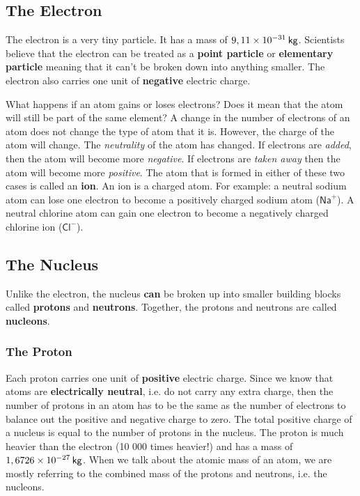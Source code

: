             \subsection*{The Electron}
            \nopagebreak
        \label{m38745*id255241}The electron is a very tiny particle. It has a mass of $9,11\ensuremath{\times}{10}^{-31}\phantom{\rule{2pt}{0ex}}\mathsf{kg}$.
Scientists believe that the electron can be treated as a \textbf{point particle}
or \textbf{elementary particle}
meaning that it can't be broken down into anything smaller. The electron also carries one unit of \textbf{negative} electric charge.\par \label{m38745*eip-222}What happens if an atom gains or loses electrons? Does it mean that the atom will still be part of the same element? A change in the number of electrons of an atom does not change the type of atom that it is. However, the charge of the atom will change. The \textsl{neutrality} of the atom has changed. If electrons are \textsl{added}, then the atom will become more \textsl{negative}. If electrons are \textsl{taken away} then the atom will become more \textsl{positive}. The atom that is formed in either of these two cases is called an \textbf{ion}. An ion is a charged atom. For example: a neutral sodium atom can lose one electron to become a positively charged sodium atom ($\mathsf{Na}^{+}$). A neutral chlorine atom can gain one electron to become a negatively charged chlorine ion ($\mathsf{Cl}^{-}$).\par 
      \label{m38745*uid11}
            \subsection*{The Nucleus}
            \nopagebreak
        \label{m38745*id255305}Unlike the electron, the nucleus \textbf{can} be broken up into smaller building
blocks called \textbf{protons} and \textbf{neutrons}. Together, the protons and
neutrons are called \textbf{nucleons}.\par 
        \label{m38745*uid12}
            \subsubsection*{The Proton}
            \nopagebreak
          \label{m38745*id255338}Each proton carries one unit of \textbf{positive} electric charge.
Since we know that atoms are
\textbf{electrically neutral}, i.e. do not carry any extra charge, then the number
of protons in an atom has to be the same as the number of electrons to balance
out the positive and negative charge to zero. The total positive charge of a
nucleus is equal to the number of protons in the nucleus. The proton is much heavier
than the electron (10 000 times heavier!) and has a mass of $1,6726\ensuremath{\times}{10}^{-27}\phantom{\rule{2pt}{0ex}}\mathsf{kg}$. When we talk about the atomic mass of an atom, we are mostly referring to the combined mass of the protons and neutrons, i.e. the nucleons.\par 
        \label{m38745*uid13}
